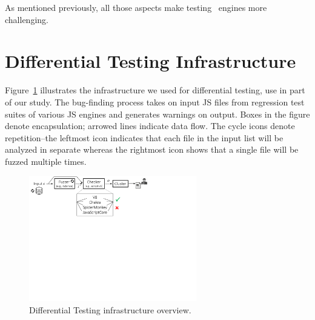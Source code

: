 \documentclass[10pt,conference,anonymous]{IEEEtran}
\begin{document}
As mentioned previously, all those aspects make testing \js\ engines
more challenging.







\section{Differential Testing Infrastructure}
\label{sec:design}


Figure~\ref{fig:workflow} illustrates the infrastructure we used for
differential testing, use in part of our study. The bug-finding
process takes on input JS files from regression test suites of various
JS engines and generates warnings on output. Boxes in the figure
denote encapsulation; arrowed lines indicate data flow. The cycle
icons denote repetition--the leftmost icon indicates that each file in
the input list will be analyzed in separate whereas the rightmost icon
shows that a single file will be fuzzed multiple times.

\begin{figure}[h]
  \centering
  \includegraphics[trim=0 350 0 0,clip,width=0.65\textwidth]{diff-testing-runtimes}
  \caption{\label{fig:workflow}Differential Testing infrastructure overview.}
\end{figure}
\end{document}
